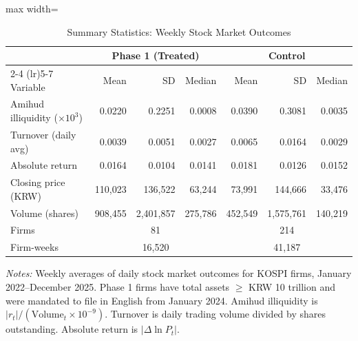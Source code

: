 \begin{table}[H]
\centering
\caption{Summary Statistics: Weekly Stock Market Outcomes}
\label{tab:summary}
\begin{threeparttable}
\begin{adjustbox}{max width=\textwidth}
\begin{tabular}{lrrrrrr}
\toprule
 & \multicolumn{3}{c}{Phase 1 (Treated)} & \multicolumn{3}{c}{Control} \\
\cmidrule(lr){2-4} \cmidrule(lr){5-7}
Variable & Mean & SD & Median & Mean & SD & Median \\
\midrule
Amihud illiquidity ($\times 10^3$) & 0.0220 & 0.2251 & 0.0008 & 0.0390 & 0.3081 & 0.0035 \\
Turnover (daily avg) & 0.0039 & 0.0051 & 0.0027 & 0.0065 & 0.0164 & 0.0029 \\
Absolute return & 0.0164 & 0.0104 & 0.0141 & 0.0181 & 0.0126 & 0.0152 \\
Closing price (KRW) & 110,023 & 136,522 & 63,244 & 73,991 & 144,666 & 33,476 \\
Volume (shares) & 908,455 & 2,401,857 & 275,786 & 452,549 & 1,575,761 & 140,219 \\
\midrule
Firms & \multicolumn{3}{c}{81} & \multicolumn{3}{c}{214} \\
Firm-weeks & \multicolumn{3}{c}{16,520} & \multicolumn{3}{c}{41,187} \\
\bottomrule
\end{tabular}
\end{adjustbox}
\begin{tablenotes}[flushleft]
\small
\item \textit{Notes:} Weekly averages of daily stock market outcomes for KOSPI firms, January 2022--December 2025. Phase 1 firms have total assets $\geq$ KRW 10 trillion and were mandated to file in English from January 2024. Amihud illiquidity is $|r_t|/(\text{Volume}_t \times 10^{-9})$. Turnover is daily trading volume divided by shares outstanding. Absolute return is $|\Delta \ln P_t|$.
\end{tablenotes}
\end{threeparttable}
\end{table}
